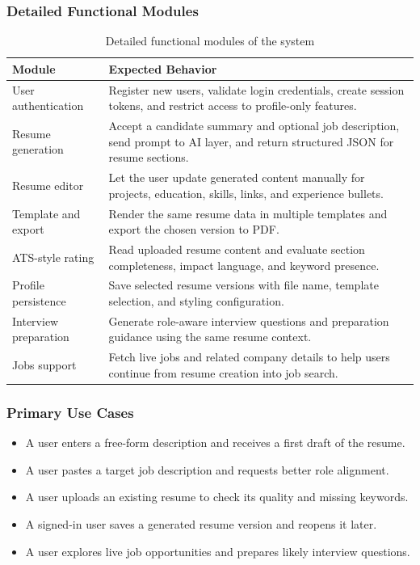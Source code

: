 \subsubsection{Detailed Functional Modules}
\begin{table}[H]
\centering
\caption{Detailed functional modules of the system}
\begin{tabular}{|p{3.5cm}|p{8.6cm}|}
\hline
\textbf{Module} & \textbf{Expected Behavior} \\
\hline
User authentication & Register new users, validate login credentials, create session tokens, and restrict access to profile-only features. \\
\hline
Resume generation & Accept a candidate summary and optional job description, send prompt to AI layer, and return structured JSON for resume sections. \\
\hline
Resume editor & Let the user update generated content manually for projects, education, skills, links, and experience bullets. \\
\hline
Template and export & Render the same resume data in multiple templates and export the chosen version to PDF. \\
\hline
ATS-style rating & Read uploaded resume content and evaluate section completeness, impact language, and keyword presence. \\
\hline
Profile persistence & Save selected resume versions with file name, template selection, and styling configuration. \\
\hline
Interview preparation & Generate role-aware interview questions and preparation guidance using the same resume context. \\
\hline
Jobs support & Fetch live jobs and related company details to help users continue from resume creation into job search. \\
\hline
\end{tabular}
\end{table}

\subsubsection{Primary Use Cases}
\begin{itemize}
\item A user enters a free-form description and receives a first draft of the resume.
\item A user pastes a target job description and requests better role alignment.
\item A user uploads an existing resume to check its quality and missing keywords.
\item A signed-in user saves a generated resume version and reopens it later.
\item A user explores live job opportunities and prepares likely interview questions.
\end{itemize}

